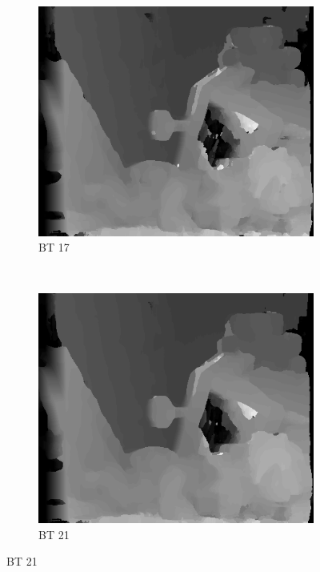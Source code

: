 \begin{figure}
\begin{subfigure}[b]{0.23\textwidth}
    \centering
    \includegraphics[width=\textwidth]{images/stereo-pairs/teddy_bt_17.png}
    \caption{BT 17}
  \end{subfigure}
  ~
  \begin{subfigure}[b]{0.23\textwidth}
    \centering
    \includegraphics[width=\textwidth]{images/stereo-pairs/teddy_bt_21.png}
    \caption{BT 21}
  \end{subfigure}





\end{figure}
